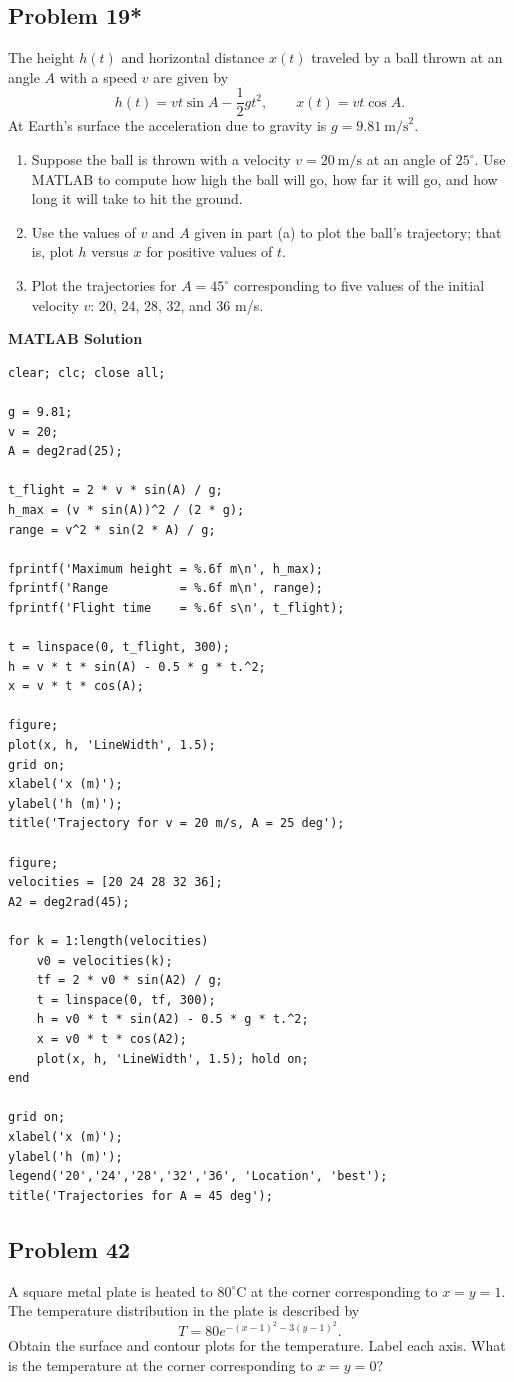 \documentclass[12pt]{article}
\newcommand{\questiontitle}[2]{%
    \phantomsection
    \hypertarget{#1}{}%
    \subsection*{#2}
}
\newcommand{\solutiontitle}{\noindent\textbf{MATLAB Solution}}
\begin{document}
\questiontitle{tut5-q19}{Problem 19*}
The height $h(t)$ and horizontal distance $x(t)$ traveled by a ball thrown at an angle $A$ with a speed $v$ are given by
\[
h(t) = vt\sin A - \frac{1}{2}gt^{2},
\qquad
x(t) = vt\cos A.
\]
At Earth's surface the acceleration due to gravity is $g = 9.81~\text{m/s}^{2}$.
\begin{enumerate}[label=\alph*.]
    \item Suppose the ball is thrown with a velocity $v = 20~\text{m/s}$ at an angle of $25^\circ$. Use MATLAB to compute how high the ball will go, how far it will go, and how long it will take to hit the ground.
    \item Use the values of $v$ and $A$ given in part (a) to plot the ball's trajectory; that is, plot $h$ versus $x$ for positive values of $t$.
    \item Plot the trajectories for $A = 45^\circ$ corresponding to five values of the initial velocity $v$: 20, 24, 28, 32, and 36 m/s.
\end{enumerate}

\solutiontitle
\begin{lstlisting}
clear; clc; close all;

g = 9.81;
v = 20;
A = deg2rad(25);

t_flight = 2 * v * sin(A) / g;
h_max = (v * sin(A))^2 / (2 * g);
range = v^2 * sin(2 * A) / g;

fprintf('Maximum height = %.6f m\n', h_max);
fprintf('Range          = %.6f m\n', range);
fprintf('Flight time    = %.6f s\n', t_flight);

t = linspace(0, t_flight, 300);
h = v * t * sin(A) - 0.5 * g * t.^2;
x = v * t * cos(A);

figure;
plot(x, h, 'LineWidth', 1.5);
grid on;
xlabel('x (m)');
ylabel('h (m)');
title('Trajectory for v = 20 m/s, A = 25 deg');

figure;
velocities = [20 24 28 32 36];
A2 = deg2rad(45);

for k = 1:length(velocities)
    v0 = velocities(k);
    tf = 2 * v0 * sin(A2) / g;
    t = linspace(0, tf, 300);
    h = v0 * t * sin(A2) - 0.5 * g * t.^2;
    x = v0 * t * cos(A2);
    plot(x, h, 'LineWidth', 1.5); hold on;
end

grid on;
xlabel('x (m)');
ylabel('h (m)');
legend('20','24','28','32','36', 'Location', 'best');
title('Trajectories for A = 45 deg');
\end{lstlisting}

\questiontitle{tut5-q42}{Problem 42}
A square metal plate is heated to $80^\circ$C at the corner corresponding to $x = y = 1$. The temperature distribution in the plate is described by
\[
T = 80e^{-(x-1)^{2} - 3(y-1)^{2}}.
\]
Obtain the surface and contour plots for the temperature. Label each axis. What is the temperature at the corner corresponding to $x = y = 0$?
\end{document}
